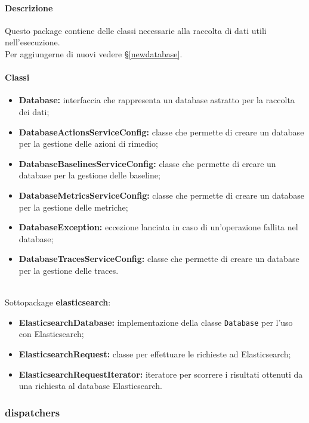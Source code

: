 		\paragraph*{Descrizione}
			Questo package contiene delle classi necessarie alla raccolta di dati utili nell'esecuzione.\\
			Per aggiungerne di nuovi vedere §\ref{newdatabase}.
			
			
		\paragraph*{Classi}
			
			\begin{itemize}
				\item \textbf{Database:} interfaccia che rappresenta un database astratto per la 
					raccolta dei dati;
				\item \textbf{DatabaseActionsServiceConfig:} classe che permette di creare un 
					database per la gestione delle azioni di rimedio;
				\item \textbf{DatabaseBaselinesServiceConfig:} classe che permette di creare un 
					database per la gestione delle baseline;
				\item \textbf{DatabaseMetricsServiceConfig:} classe che permette di creare un 
					database per la gestione delle metriche;
				\item \textbf{DatabaseException:} eccezione lanciata in caso di un'operazione 
					fallita nel database;
				\item \textbf{DatabaseTracesServiceConfig:} classe che permette di creare un 
					database per la gestione delle traces.
			\end{itemize}\\
			
			Sottopackage \textbf{elasticsearch}:
			\begin{itemize}
				\item \textbf{ElasticsearchDatabase:} implementazione della classe \verb=Database=
					per l'uso con Elasticsearch;
				\item \textbf{ElasticsearchRequest:} classe per effettuare le richieste ad Elasticsearch;
				\item \textbf{ElasticsearchRequestIterator:} iteratore per scorrere i risultati ottenuti
					da una richiesta al database Elasticsearch.
			\end{itemize}

\newpage

	\subsubsection{dispatchers}
	

